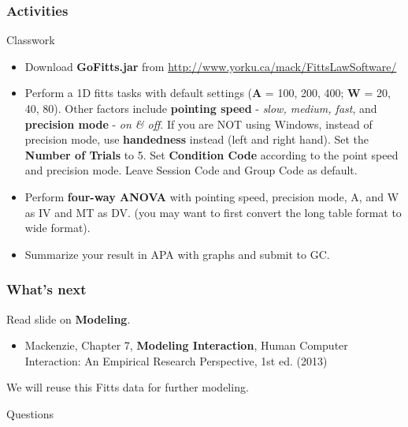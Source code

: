 \documentclass{beamer}
\begin{document}
\begin{frame}
	\frametitle{Activities}
	\begin{block}{Classwork}
		\footnotesize
		\begin{itemize}
			\item Download \textbf{GoFitts.jar} from \url{http://www.yorku.ca/mack/FittsLawSoftware/}
			\item Perform a 1D fitts tasks with default settings (\textbf{A} = 100, 200, 400; \textbf{W} = 20, 40, 80).  Other factors include \textbf{pointing speed} - \textit{slow, medium, fast}, and \textbf{precision mode} - \textit{on \& off}.    If you are NOT using Windows, instead of precision mode, use \textbf{handedness} instead (left and right hand).    Set the \textbf{Number of Trials} to 5.  Set \textbf{Condition Code} according to the point speed and precision mode.  Leave Session Code and Group Code as default.
			\item Perform\textbf{ four-way ANOVA} with pointing speed, precision mode, A, and W as IV and MT as DV.   (you may want to first convert the long table format to wide format).  
			\item Summarize your result in APA with graphs and submit to GC.
		\end{itemize}
	\end{block}
\end{frame}


\begin{frame}
\frametitle{What's next}
Read slide on \textbf{Modeling}.
\begin{itemize}
	\item Mackenzie, Chapter 7, \textbf{Modeling Interaction},  Human Computer Interaction: An Empirical Research Perspective, 1st ed. (2013) 
\end{itemize}
We will reuse this Fitts data for further modeling.
\end{frame}


\begin{frame}
\Huge{\centerline{Questions}}
\end{frame}

\end{document}
